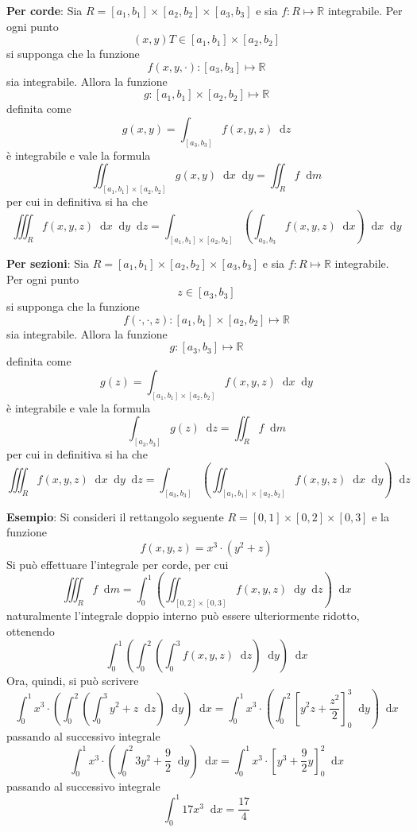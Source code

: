 \documentclass[a4paper]{extarticle}
\newcommand*\dif{\mathop{}\!\mathrm{d}}
\begin{document}
\vspace{1em}
\noindent
\textbf{Per corde}: Sia $R = [a_1,b_1] \times [a_2,b_2] \times [a_3,b_3]$ e sia $f : R \longmapsto \mathbb{R}$ integrabile. Per ogni punto
\[(x,y){T} \in [a_1,b_1] \times [a_2,b_2]\]
si supponga che la funzione
\[f(x,y,\cdot) : [a_3,b_3] \longmapsto \mathbb{R}\]
sia integrabile. Allora la funzione
\[g : [a_1,b_1] \times [a_2,b_2] \longmapsto \mathbb{R}\]
definita come
\[g(x,y) = \int_{[a_3,b_3]} f(x,y,z) \dif z\]
è integrabile e vale la formula
\[\iint_{[a_1,b_1] \times [a_2,b_2]} g(x,y) \dif x \dif y = \iint_R f \dif m\]
per cui in definitiva si ha che
\[\iiint_R f(x,y,z) \dif x \dif y \dif z = \int_{[a_1,b_1] \times [a_2,b_2]} \left(\int_{a_3,b_3} f(x,y,z) \dif x\right) \dif x \dif y\]

\vspace{1em}
\noindent
\textbf{Per sezioni}: Sia $R = [a_1,b_1] \times [a_2,b_2] \times [a_3,b_3]$ e sia $f : R \longmapsto \mathbb{R}$ integrabile. Per ogni punto
\[z \in [a_3,b_3]\]
si supponga che la funzione
\[f(\cdot,\cdot,z) : [a_1,b_1] \times [a_2,b_2] \longmapsto \mathbb{R}\]
sia integrabile. Allora la funzione
\[g : [a_3,b_3] \longmapsto \mathbb{R}\]
definita come
\[g(z) = \int_{[a_1,b_1]\times[a_2,b_2]} f(x,y,z) \dif x \dif y\]
è integrabile e vale la formula
\[\int_{[a_3,b_3]} g(z) \dif z = \iint_R f \dif m\]
per cui in definitiva si ha che
\[\iiint_R f(x,y,z) \dif x \dif y \dif z = \int_{[a_3,b_3]} \left(\iint_{[a_1,b_1] \times [a_2,b_2]} f(x,y,z) \dif x \dif y\right) \dif z\]

\vspace{1em}
\noindent
\textbf{Esempio}: Si consideri il rettangolo seguente $R=[0,1]\times[0,2]\times[0,3]$ e la funzione
\[f(x,y,z) = x^3 \cdot (y^2 + z)\]
Si può effettuare l'integrale per corde, per cui
\[\iiint_R f \dif m = \int_0^1 \left(\iint_{[0,2] \times [0,3]} f(x,y,z) \dif y \dif z\right) \dif x\]
naturalmente l'integrale doppio interno può essere ulteriormente ridotto, ottenendo
\[\int_0^1 \left(\int_0^2 \left( \int_0^3 f(x,y,z) \dif z \right) \dif y\right) \dif x\]
Ora, quindi, si può scrivere
\[\int_0^1 x^3 \cdot \left(\int_0^2 \left( \int_0^3 y^2 + z \dif z \right) \dif y\right) \dif x = \int_0^1 x^3 \cdot \left(\int_0^2 \left[y^2z + \dfrac{z^2}{2}\right]_0^3 \dif y\right) \dif x\]
passando al successivo integrale
\[\int_0^1 x^3 \cdot \left(\int_0^2 3y^2 + \dfrac{9}{2} \dif y\right) \dif x = \int_0^1 x^3 \cdot \left[y^3 + \dfrac{9}{2}y\right]_0^2 \dif x\]
passando al successivo integrale
\[\int_0^1 17x^3 \dif x = \dfrac{17}{4}\]
\end{document}
